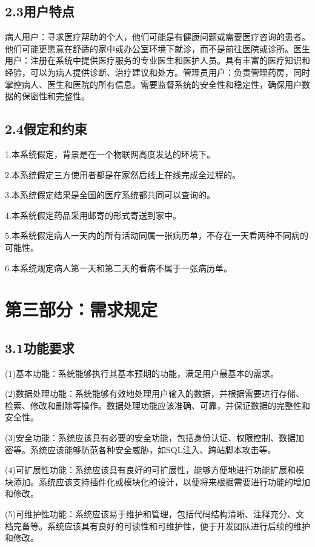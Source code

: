 \documentclass[24pt,a4paper]{article}%
\begin{document}
\subsection*{\songti 2.3用户特点}
病人用户：寻求医疗帮助的个人，他们可能是有健康问题或需要医疗咨询的患者。他们可能更愿意在舒适的家中或办公室环境下就诊，而不是前往医院或诊所。医生用户：注册在系统中提供医疗服务的专业医生和医护人员。具有丰富的医疗知识和经验，可以为病人提供诊断、治疗建议和处方。管理员用户：负责管理药房，同时掌控病人、医生和医院的所有信息。需要监督系统的安全性和稳定性，确保用户数据的保密性和完整性。
\subsection*{\songti 2.4假定和约束}
1.本系统假定，背景是在一个物联网高度发达的环境下。\par
2.本系统假定三方使用者都是在家然后线上在线完成全过程的。\par
3.本系统假定结果是全国的医疗系统都共同可以查询的。\par
4.本系统假定药品采用邮寄的形式寄送到家中。\par
5.本系统假定病人一天内的所有活动同属一张病历单，不存在一天看两种不同病的可能性。\par
6.本系统规定病人第一天和第二天的看病不属于一张病历单。
\newpage

\section*{\songti 第三部分：需求规定}
\subsection*{\songti 3.1功能要求}
\noindent (1)基本功能：系统能够执行其基本预期的功能，满足用户最基本的需求。 \par
\noindent (2)数据处理功能：系统能够有效地处理用户输入的数据，并根据需要进行存储、检索、修改和删除等操作。数据处理功能应该准确、可靠，并保证数据的完整性和安全性。\par
\noindent (3)安全功能：系统应该具有必要的安全功能，包括身份认证、权限控制、数据加密等。系统应该能够防范各种安全威胁，如SQL注入、跨站脚本攻击等。\par
\noindent (4)可扩展性功能：系统应该具有良好的可扩展性，能够方便地进行功能扩展和模块添加。系统应该支持插件化或模块化的设计，以便将来根据需要进行功能的增加和修改。\par
\noindent (5)可维护性功能：系统应该易于维护和管理，包括代码结构清晰、注释充分、文档完备等。系统应该具有良好的可读性和可维护性，便于开发团队进行后续的维护和修改。
\end{document}
